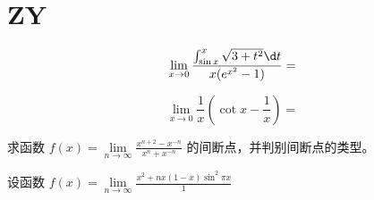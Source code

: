 \section{ZY}
\begin{question}
    \begin{equation}
        \nonumber
        \lim\limits_{ x \to 0 } \frac{ \int_{\sin x}^{x} \sqrt{ 3 + t^2 } \d t }{ x ( e^{x^2} - 1 ) } = 
    \end{equation}
\end{question}

\begin{question}
    \begin{equation}
        \nonumber
        \lim\limits_{ x \to 0 } \frac{1}{x} ( \cot x - \frac{1}{x} ) = 
    \end{equation}
\end{question}

\begin{question}
    求函数 $ f(x) = \lim\limits_{ n \to \infty } \frac{ x^{ n + 2 } - x^{ -n } }{ x^n + x^{ -n } } $ 的间断点，并判别间断点的类型。
\end{question}

\begin{question}
    设函数 $ f(x) = \lim\limits_{ n \to \infty } \frac{ x^2 + nx( 1 - x ) \sin ^2 \pi x }{1} $ 
\end{question}

